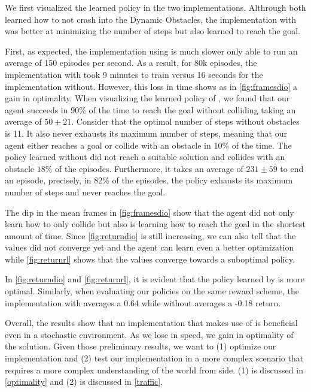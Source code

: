    We first visualized the learned policy in the two implementations. Althrough both learned 
    how to not crash into the Dynamic Obstacles, the implementation with \dio{} was better at minimizing the number of steps 
    but also learned to reach the goal. 

    First, as expected, the implementation using \dio{} is much slower only able to run 
    an average of 150 episodes per second. As a result, for 80k episodes, the implementation with \dio{} 
    took 9 minutes to train versus 16 seconds for the implementation without. However, this loss in time shows as in \ref{fig:framesdio} 
    a gain in optimality. When visualizing the learned policy of \dio{}, we found that our agent succeeds in 90\% 
    of the time to reach the goal without colliding taking an average of $50 \pm 21$. Consider that 
    the optimal number of steps without obstacles is 11. It also never exhausts its maximum number of steps, 
    meaning that our agent either reaches a goal or collide with an obstacle in 10\% of the time. The policy learned without \dio{} did not reach a suitable solution and collides with an obstacle $18\%$ of the episodes. Furthermore, it takes an average of $231 \pm 59$ to end an episode, 
    precisely, in 82\% of the episodes, the policy exhausts its maximum number of steps and never reaches the goal.


    The dip in the mean frames in \ref{fig:framesdio} show that the agent did not only learn 
    how to only collide but also is learning how to reach the goal in the shortest amount of time. 
    Since \ref{fig:returndio} is still increasing, we can also tell that the values did not converge yet and 
    the agent can learn even a better optimization while \ref{fig:returnrl} shows that the values converge towards
    a suboptimal policy.


    In \ref{fig:returndio} and \ref{fig:returnrl}, it is evident that the policy learned by \dio{} 
    is more optimal. Similarly, when evaluating our policies on the same reward scheme, 
    the implementation with \dio{} averages a 0.64 while without \dio{} averages a -0.18 return.

    Overall, the results show that an implementation that makes use of
    \dio{} is beneficial even in a stochastic environment. As we lose in speed, we gain in optimality of the solution. 
    Given those preliminary results, we want to (1) optimize our implementation 
    and (2) test our implementation in a more complex scenario that requires a more complex understanding of the world 
    from \dio{} side. (1) is discussed in \ref{optimality} and (2) is discussed in \ref{traffic}. 

    
